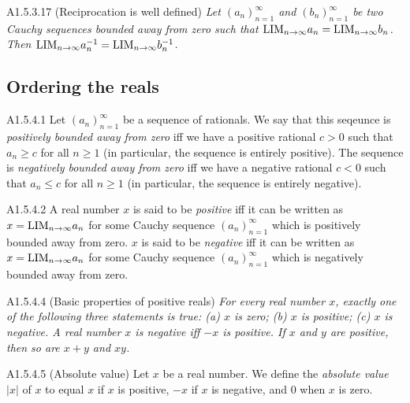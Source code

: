 \begin{lemma}{A1.5.3.17}
    (Reciprocation is well defined) \emph{Let $(a_n)_{n=1}^{\infty}$ and $(b_n)_{n=1}^{\infty}$
    be two Cauchy sequences bounded away from zero such that $\text{LIM}_{n \rightarrow \infty}{a_n} = \text{LIM}_{n \rightarrow \infty}{b_n}$.
    Then $\text{LIM}_{n \rightarrow \infty}{a_n^{-1}} = \text{LIM}_{n \rightarrow \infty}{b_n^{-1}}$.}
\end{lemma}

\subsection{Ordering the reals}
\begin{definition}{A1.5.4.1}
    Let $(a_n)_{n=1}^{\infty}$ be a sequence of rationals. We say that this seqeunce
    is \emph{positively bounded away from zero} iff we have a positive rational
    $c > 0$ such that $a_n \geq c$ for all $n \geq 1$ (in particular, the sequence
    is entirely positive). The sequence is \emph{negatively bounded away from zero}
    iff we have a negative rational $c < 0$ such that $a_n \leq c$ for all $n \geq 1$
    (in particular, the sequence is entirely negative).
\end{definition}

\begin{definition}{A1.5.4.2}
    A real number $x$ is said to be \emph{positive} iff it can be written as
    $x = \text{LIM}_{n \rightarrow \infty}{a_n}$ for some Cauchy sequence $(a_n)_{n=1}^{\infty}$ which
    is positively bounded away from zero. $x$ is said to be \emph{negative} iff
    it can be written as $x = \text{LIM}_{n \rightarrow \infty}{a_n}$ for some Cauchy sequence
    $(a_n)_{n=1}^{\infty}$ which is negatively bounded away from zero.
\end{definition}

\begin{proposition}{A1.5.4.4}
    (Basic properties of positive reals) \emph{For every real number $x$, exactly
    one of the following three statements is true: (a) $x$ is zero; (b) $x$ is
    positive; (c) $x$ is negative. A real number $x$ is negative iff $-x$ is positive.
    If $x$ and $y$ are positive, then so are $x + y$ and $xy$.}
\end{proposition}

\begin{definition}{A1.5.4.5}
    (Absolute value) Let $x$ be a real number. We define the \emph{absolute value}
    $|x|$ of $x$ to equal $x$ if $x$ is positive, $-x$ if $x$ is negative, and $0$
    when $x$ is zero.
\end{definition}


